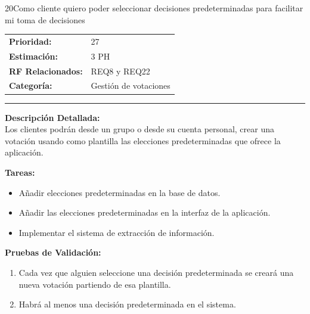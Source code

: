 \begin{hu_card}{20}{Como cliente quiero poder seleccionar decisiones predeterminadas para facilitar mi toma de decisiones}
    \begin{tabularx}{\linewidth}{l X}
        \textbf{Prioridad:}   & 27\\
        \textbf{Estimación:}  & 3 PH \\
        \textbf{RF Relacionados:} & REQ8 y REQ22 \\
        \textbf{Categoría:} & Gestión de votaciones \\
    \end{tabularx}

    \vspace{2mm}
    \hrule
    \vspace{2mm}

    \textbf{Descripción Detallada:} \\
    Los clientes podrán desde un grupo o desde su cuenta personal, crear una votación usando como plantilla las elecciones predeterminadas que ofrece la aplicación.

    \vspace{2mm}
    \textbf{Tareas:}
    \begin{itemize}[noitemsep, topsep=0pt]
        \item Añadir elecciones predeterminadas en la base de datos.
        \item Añadir las elecciones predeterminadas en la interfaz de la aplicación. 
        \item Implementar el sistema de extracción de información.
    \end{itemize}

    \vspace{2mm}
    \textbf{Pruebas de Validación:}
    \begin{enumerate}[noitemsep, topsep=0pt]
        \item Cada vez que alguien seleccione una decisión predeterminada se creará una nueva votación partiendo de esa plantilla.
        \item Habrá al menos una decisión predeterminada en el sistema.
    \end{enumerate}
\end{hu_card}


